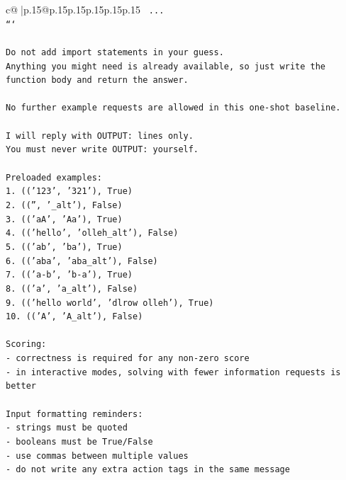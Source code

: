 \documentclass{article}
\begin{document}
{\begin{supertabular}{c@{$\;$}|p{.15\linewidth}@{}p{.15\linewidth}p{.15\linewidth}p{.15\linewidth}p{.15\linewidth}p{.15\linewidth}}
{{{\texttt{    ...} \\
\texttt{```} \\
\\ 
\texttt{Do not add import statements in your guess.} \\
\texttt{Anything you might need is already available, so just write the function body and return the answer.} \\
\\ 
\texttt{No further example requests are allowed in this one{-}shot baseline.} \\
\\ 
\texttt{I will reply with OUTPUT: lines only.} \\
\texttt{You must never write OUTPUT: yourself.} \\
\\ 
\texttt{Preloaded examples:} \\
\texttt{1. (('123', '321'), True)} \\
\texttt{2. (('', '\_alt'), False)} \\
\texttt{3. (('aA', 'Aa'), True)} \\
\texttt{4. (('hello', 'olleh\_alt'), False)} \\
\texttt{5. (('ab', 'ba'), True)} \\
\texttt{6. (('aba', 'aba\_alt'), False)} \\
\texttt{7. (('a{-}b', 'b{-}a'), True)} \\
\texttt{8. (('a', 'a\_alt'), False)} \\
\texttt{9. (('hello world', 'dlrow olleh'), True)} \\
\texttt{10. (('A', 'A\_alt'), False)} \\
\\ 
\texttt{Scoring:} \\
\texttt{{-} correctness is required for any non{-}zero score} \\
\texttt{{-} in interactive modes, solving with fewer information requests is better} \\
\\ 
\texttt{Input formatting reminders:} \\
\texttt{{-} strings must be quoted} \\
\texttt{{-} booleans must be True/False} \\
\texttt{{-} use commas between multiple values} \\
\texttt{{-} do not write any extra action tags in the same message} \\
\\ 
}}}
\end{supertabular}}
\end{document}
